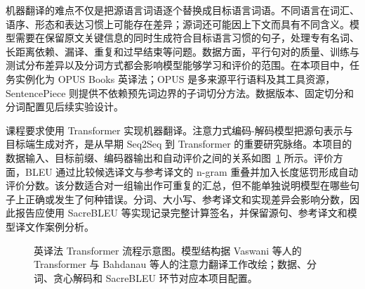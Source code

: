 \documentclass[UTF8,a4paper,12pt,fontset=none]{ctexart}
\begin{document}
机器翻译的难点不仅是把源语言词语逐个替换成目标语言词语。不同语言在词汇、语序、形态和表达习惯上可能存在差异；源词还可能因上下文而具有不同含义。模型需要在保留原文关键信息的同时生成符合目标语言习惯的句子，处理专有名词、长距离依赖、漏译、重复和过早结束等问题。数据方面，平行句对的质量、训练与测试分布差异以及分词方式都会影响模型能够学习和评价的范围。在本项目中，任务实例化为 OPUS Books 英译法；OPUS 是多来源平行语料及其工具资源，SentencePiece 则提供不依赖预先词边界的子词切分方法\cite{opus,opusbooks,sentencepiece}。数据版本、固定切分和分词配置见后续实验设计。

课程要求使用 Transformer 实现机器翻译。注意力式编码-解码模型把源句表示与目标端生成对齐，是从早期 Seq2Seq 到 Transformer 的重要研究脉络\cite{seq2seq,bahdanau,transformer}。本项目的数据输入、目标前缀、编码器输出和自动评价之间的关系如图~\ref{fig:nmt-flow} 所示。评价方面，BLEU 通过比较候选译文与参考译文的 n-gram 重叠并加入长度惩罚形成自动评价分数\cite{bleu}。该分数适合对一组输出作可重复的汇总，但不能单独说明模型在哪些句子上正确或发生了何种错误。分词、大小写、参考译文和实现差异会影响分数，因此报告应使用 SacreBLEU 等实现记录完整计算签名，并保留源句、参考译文和模型译文作案例分析\cite{post}。

\begin{figure}[htbp]
  \centering
  \caption{英译法 Transformer 流程示意图。模型结构据 Vaswani 等人的 Transformer 与 Bahdanau 等人的注意力翻译工作改绘；数据、分词、贪心解码和 SacreBLEU 环节对应本项目配置\cite{bahdanau,transformer,sentencepiece,post}。}
  \label{fig:nmt-flow}
\end{figure}
\end{document}

